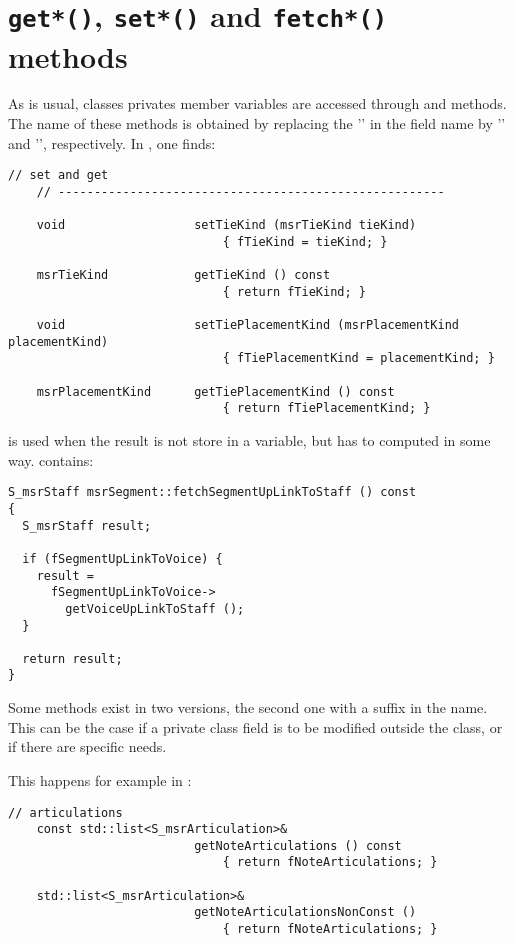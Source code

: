 \section{{\tt get*()}, {\tt set*()} and {\tt fetch*()} methods}

As is usual, classes privates member variables are accessed through  and  methods. The name of these methods is obtained by replacing the '' in the field name by '' and '', respectively. In , one finds:
\begin{lstlisting}[language=CPlusPlus]
    // set and get
    // ------------------------------------------------------

    void                  setTieKind (msrTieKind tieKind)
                              { fTieKind = tieKind; }

    msrTieKind            getTieKind () const
                              { return fTieKind; }

    void                  setTiePlacementKind (msrPlacementKind placementKind)
                              { fTiePlacementKind = placementKind; }

    msrPlacementKind      getTiePlacementKind () const
                              { return fTiePlacementKind; }
\end{lstlisting}


 is used when the result is not store in a variable, but has to computed in some way.  contains:
\begin{lstlisting}[language=CPlusPlus]
S_msrStaff msrSegment::fetchSegmentUpLinkToStaff () const
{
  S_msrStaff result;

  if (fSegmentUpLinkToVoice) {
    result =
      fSegmentUpLinkToVoice->
        getVoiceUpLinkToStaff ();
  }

  return result;
}
\end{lstlisting}

Some methods exist in two versions, the second one with a  suffix in the name. This can be the case if a private class   field is to be modified outside the class, or if there are specific needs.

This happens for example in :
\begin{lstlisting}[language=CPlusPlus]
    // articulations
    const std::list<S_msrArticulation>&
                          getNoteArticulations () const
                              { return fNoteArticulations; }

    std::list<S_msrArticulation>&
                          getNoteArticulationsNonConst ()
                              { return fNoteArticulations; }
\end{lstlisting}

